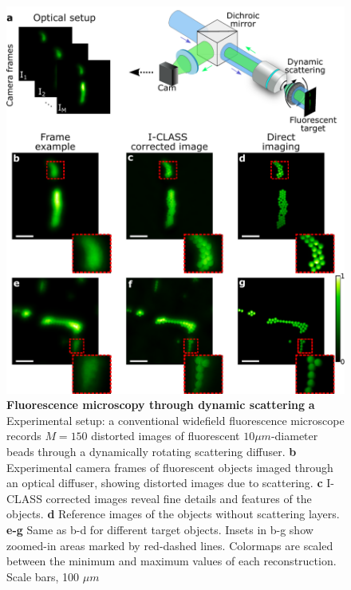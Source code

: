 \documentclass[pdflatex,sn-mathphys-num]{sn-jnl}%
\theoremstyle{thmstyleone}%
\theoremstyle{thmstyletwo}%
\theoremstyle{thmstylethree}%
\begin{document}
\begin{figure}[htb!]
	\centering
	\includegraphics [width=1.03\textwidth,]
	{figures/figure_4.pdf}
    \caption{\textbf{Fluorescence microscopy through dynamic scattering}
    \textbf{a} Experimental setup: a conventional widefield fluorescence microscope records $M=150$ distorted images of fluorescent $10\mu m$-diameter beads through a dynamically rotating scattering diffuser.
    \textbf{b} Experimental camera frames of fluorescent objects imaged through an optical diffuser, showing distorted images due to scattering.
    \textbf{c} I-CLASS corrected images reveal fine details and features of the objects.
    \textbf{d} Reference images of the objects without scattering layers. \textbf{e-g} Same as b-d for different target objects. 
    Insets in b-g show zoomed-in areas marked by red-dashed lines. Colormaps are scaled between the minimum and maximum values of each reconstruction. Scale bars, 100 $\mu m$}
        \label{fig4}
    \end{figure} 
\end{document}
